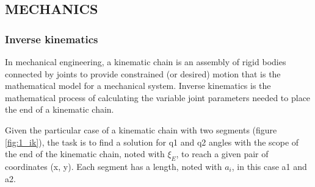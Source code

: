 \documentclass[runningheads,a4paper,12pt]{report}
\begin{document}
\subsection{MECHANICS}
\label{section:mechanics}

\subsubsection*{Inverse kinematics}
\label{section:inverse-kinematics}
In mechanical engineering, a kinematic chain is an assembly of rigid bodies connected by joints to provide constrained (or desired) motion that is the mathematical model for a mechanical system. Inverse kinematics is the mathematical process of calculating the variable joint parameters needed to place the end of a kinematic chain.

Given the particular case of a kinematic chain with two segments (figure \ref{fig:1_ik}), the task is to find a solution for q1 and q2 angles with the scope of the end of the kinematic chain, noted with $\xi_E$, to reach a given pair of coordinates (x, y). Each segment has a length, noted with $a_i$, in this case a1 and a2. 
\end{document}
